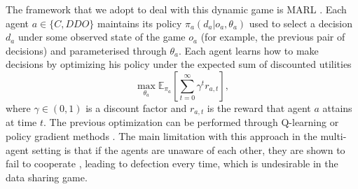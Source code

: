 



The framework that we adopt to deal with this 
dynamic game is MARL 
\parencite{marl_over}. Each agent $a \in \lbrace C, DDO \rbrace $ maintains its policy $\pi_a(d_a|o_a, \theta_a)$ used to select a decision $d_a$ under some observed state of the game $o_a$ (for example, the previous pair of decisions) and parameterised through 
 $\theta_a$. Each agent learns
how to make decisions by optimizing his policy under the expected sum of discounted utilities
$$
\max_{\theta_a} \mathbb{E}_{\pi_a} \left[ \sum_{t=0}^\infty \gamma^t r_{a, t} \right],
$$
where $\gamma \in (0,1)$ is a discount factor and $r_{a,t}$ is the reward that
agent $a$ attains at time $t$.
The previous optimization can be performed through 
Q-learning or policy gradient methods \parencite{sutton2012reinforcement}. 
The main limitation with this approach in the multi-agent setting is that if the
agents are unaware of each other, they are shown to fail to cooperate 
\parencite{gallego2019opponent}, leading to defection every time, which is undesirable in the data sharing  game.

